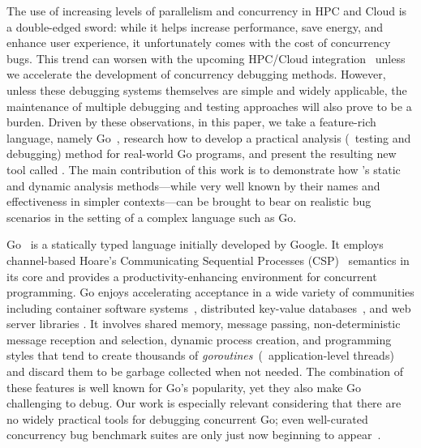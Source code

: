 The use of increasing levels of parallelism and concurrency in HPC and Cloud is a double-edged sword: while it helps increase performance, save energy, and enhance user experience, it
unfortunately comes with the cost of concurrency bugs.
%
This trend can worsen with the upcoming HPC/Cloud
integration~\cite{dan-herbein-dong} unless we accelerate the
development of concurrency debugging methods.
%
However, unless these debugging systems themselves are
simple and widely applicable, the maintenance of multiple debugging and testing approaches will also prove to be a burden.
%
Driven by these observations, in this paper, we take a feature-rich language, namely Go~\cite{go}, research how to develop a practical analysis (\ie~testing and debugging) method for real-world Go programs, and present the resulting new tool called \goat.
%
The main contribution of this work is to demonstrate how
\goat's static and dynamic analysis methods---while very well known
by their names and effectiveness in simpler contexts---can
be brought to bear on realistic bug scenarios in the setting of
a complex language such as Go.

Go~\cite{go} is a statically typed language initially developed by Google.
%
It employs channel-based Hoare's Communicating Sequential Processes (CSP)~\cite{hoare-csp78} semantics in its core and provides a productivity-enhancing environment for concurrent programming.
%
Go enjoys accelerating acceptance in a wide variety of
communities including container software systems~\cite{merkel2014docker,kubernetes},  distributed key-value databases~\cite{etcd,cockroachdb-sigmod20}, and web server libraries \cite{grpc}.
%
It involves shared memory, message passing, non-deterministic message reception and selection, dynamic process creation, and programming styles that tend to create thousands of \textit{goroutines}~(\ie~application-level threads) and discard them to be garbage collected when not needed.
%
The combination of these features is well known for Go's popularity, yet they also make Go challenging to debug.
%
Our work is especially relevant considering that there are no widely practical tools for debugging concurrent Go; even well-curated
concurrency bug benchmark suites are only just now beginning to appear~\cite{tu-concurrentBugs-asplos19,yuan-gobench-cgo21}.
%

